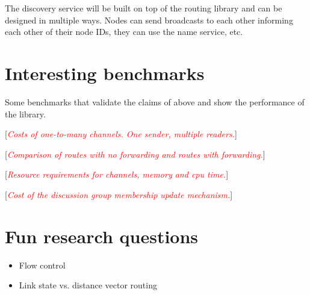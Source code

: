 \documentclass[a4paper,twoside]{report} %
\newcommand{\note}[1]{[\textcolor{red}{\textit{#1}}]}
\begin{document}
The discovery service will be built on top of the routing library
and can be designed in multiple ways.
Nodes can send broadcasts to each other informing each other of their node IDs,
they can use the name service, etc.

\chapter{Interesting benchmarks}\label{chap:benchmarks}

Some benchmarks that validate the claims of above and show the performance of the library.

\note{Costs of one-to-many channels. One sender, multiple readers.}

\note{Comparison of routes with no forwarding and routes with forwarding.}

\note{Resource requirements for channels, memory and cpu time.}

\note{Cost of the discussion group membership update mechanism.}

\chapter{Fun research questions}

\begin{itemize}
\item Flow control
\item Link state vs. distance vector routing
\end{itemize}



\end{document}
